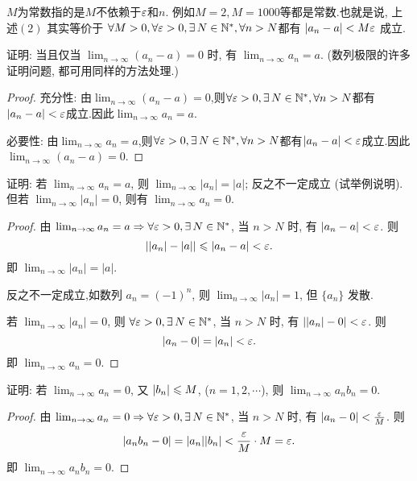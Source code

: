 $M$为常数指的是$M$不依赖于$\varepsilon$和$n$. 例如$M=2, M=1000$等都是常数.也就是说, 上述$(2)$ 其实等价于
$\forall M > 0, \forall \ve >0, \exists N\in \mathbb{N}^*, \forall n>N $都有 $|a_n-a|<M \varepsilon$ 成立.

\begin{exercise}[1.2.3]
    证明: 当且仅当 $\lim_{n\to\infty} (a_n - a) = 0$ 时, 有 $\lim_{n\to\infty} a_n = a$. (数列极限的许多证明问题, 都可用同样的方法处理.)
\end{exercise}

\begin{proof}
    充分性: 由$\lim_{n \to \infty} (a_n - a) = 0$,则$\forall \ve > 0, \exists N \in \mathbb{N}^*, \forall n > N$都有$|a_n - a| < \varepsilon$成立.因此$\lim_{n \to \infty} a_n = a$.

    必要性: 由$\lim_{n \to \infty} a_n = a$,则$\forall \ve > 0, \exists N \in \mathbb{N}^*, \forall n > N$都有$|a_n - a| < \varepsilon$成立.因此$\lim_{n \to \infty} (a_n - a) = 0$.
\end{proof}

\begin{exercise}[1.2.4]
    证明: 若 $\lim_{n\to\infty} a_n = a$, 则 $\lim_{n\to\infty} |a_n| = |a|$; 反之不一定成立 (试举例说明). 但若 $\lim_{n\to\infty} |a_n| = 0$, 则有 $\lim_{n\to\infty} a_n = 0$.
\end{exercise}

\begin{proof}
    由 $\lim_{n\to\infty} a_n = a \Rightarrow \forall \ve > 0, \exists N \in \mathbb{N}^*$, 当 $n > N$ 时, 有 $|a_n - a| < \varepsilon$. 则
    $$
        ||a_n| - |a|| \leqslant |a_n - a| < \varepsilon.
    $$
    即 $\lim_{n\to\infty} |a_n| = |a|$.

    反之不一定成立,如数列 $a_n = (-1)^n$, 则 $\lim_{n\to\infty} |a_n| = 1$, 但 $\{a_n\}$ 发散.

    若 $\lim_{n\to\infty} |a_n| = 0$, 则 $\forall \ve > 0, \exists N \in \mathbb{N}^*$, 当 $n > N$ 时, 有 $||a_n| - 0| < \varepsilon$. 则
    $$
        |a_n - 0| = |a_n| < \varepsilon.
    $$
    即 $\lim_{n\to\infty} a_n = 0$.
\end{proof}

\begin{exercise}[1.2.5]
    证明: 若 $\lim_{n\to\infty} a_n = 0$, 又 $|b_n| \leqslant M$, ($n=1,2,\cdots$), 则 $\lim_{n\to\infty} a_n b_n = 0$.
\end{exercise}

\begin{proof}
    由 $\lim_{n\to\infty} a_n = 0 \Rightarrow \forall \ve > 0, \exists N \in \mathbb{N}^*$, 当 $n > N$ 时, 有 $|a_n - 0| < \frac{\varepsilon}{M}$. 则
    $$
        |a_n b_n - 0| = |a_n| |b_n| < \frac{\varepsilon}{M} \cdot M = \varepsilon.
    $$
    即 $\lim_{n\to\infty} a_n b_n = 0$.
\end{proof}

